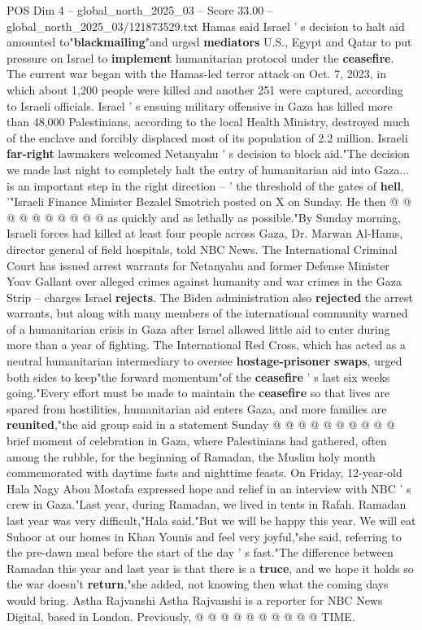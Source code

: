 \begin{textsample}{POS Dim 4 – global\_north\_2025\_03 – Score 33.00 – global\_north\_2025\_03/121873529.txt}
Hamas said Israel ' s decision to halt aid amounted to"\textbf{blackmailing}"and urged \textbf{mediators} U.S., Egypt and Qatar to put pressure on Israel to \textbf{implement} humanitarian protocol under the \textbf{ceasefire}.
The current war began with the Hamas-led terror attack on Oct. 7, 2023, in which about 1,200 people were killed and another 251 were captured, according to Israeli officials.
Israel ' s ensuing military offensive in Gaza has killed more than 48,000 Palestinians, according to the local Health Ministry, destroyed much of the enclave and forcibly displaced most of its population of 2.2 million.
Israeli \textbf{far-right} lawmakers welcomed Netanyahu ' s decision to block aid."The decision we made last night to completely halt the entry of humanitarian aid into Gaza... is an important step in the right direction -- ' the threshold of the gates of \textbf{hell}, '"Israeli Finance Minister Bezalel Smotrich posted on X on Sunday.
He then @ @ @ @ @ @ @ @ @ @ as quickly and as lethally as possible."By Sunday morning, Israeli forces had killed at least four people across Gaza, Dr.
Marwan Al-Hams, director general of field hospitals, told NBC News.
The International Criminal Court has issued arrest warrants for Netanyahu and former Defense Minister Yoav Gallant over alleged crimes against humanity and war crimes in the Gaza Strip -- charges Israel \textbf{rejects}.
The Biden administration also \textbf{rejected} the arrest warrants, but along with many members of the international community warned of a humanitarian crisis in Gaza after Israel allowed little aid to enter during more than a year of fighting.
The International Red Cross, which has acted as a neutral humanitarian intermediary to oversee \textbf{hostage-prisoner} \textbf{swaps}, urged both sides to keep"the forward momentum"of the \textbf{ceasefire} ' s last six weeks going."Every effort must be made to maintain the \textbf{ceasefire} so that lives are spared from hostilities, humanitarian aid enters Gaza, and more families are \textbf{reunited},"the aid group said in a statement Sunday @ @ @ @ @ @ @ @ @ @ brief moment of celebration in Gaza, where Palestinians had gathered, often among the rubble, for the beginning of Ramadan, the Muslim holy month commemorated with daytime fasts and nighttime feasts.
On Friday, 12-year-old Hala Nagy Abou Mostafa expressed hope and relief in an interview with NBC ' s crew in Gaza."Last year, during Ramadan, we lived in tents in Rafah.
Ramadan last year was very difficult,"Hala said."But we will be happy this year.
We will eat Suhoor at our homes in Khan Younis and feel very joyful,"she said, referring to the pre-dawn meal before the start of the day ' s fast."The difference between Ramadan this year and last year is that there is a \textbf{truce}, and we hope it holds so the war doesn't \textbf{return},"she added, not knowing then what the coming days would bring.
Astha Rajvanshi Astha Rajvanshi is a reporter for NBC News Digital, based in London.
Previously, @ @ @ @ @ @ @ @ @ @ TIME.


\end{textsample}
